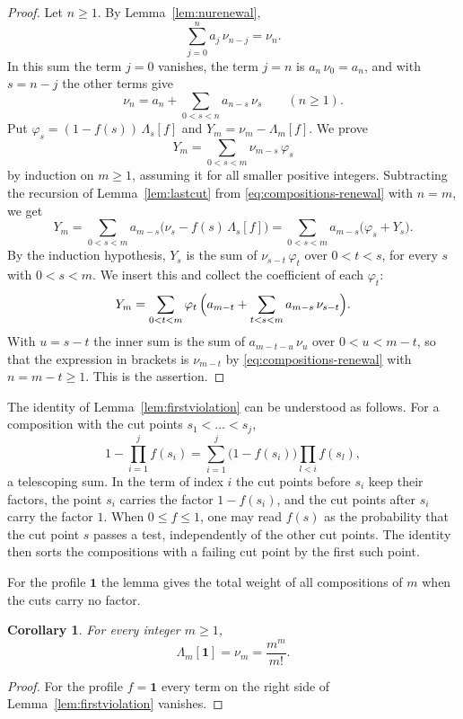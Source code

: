 \documentclass{amsart}
\newtheorem{corollary}[theorem]{Corollary}
\theoremstyle{definition}
\theoremstyle{remark}
\numberwithin{equation}{section}
\begin{document}
\begin{proof}
Let $n\ge1$. By Lemma~\ref{lem:nurenewal},
\[
\sum_{j=0}^{n}a_j\,\nu_{n-j}=\nu_n.
\]
In this sum the term $j=0$ vanishes, the term $j=n$ is $a_n\,\nu_0=a_n$, and
with $s=n-j$ the other terms give
\begin{equation}\label{eq:compositions-renewal}
\nu_n=a_n+\sum_{0<s<n}a_{n-s}\,\nu_s\qquad(n\ge1).
\end{equation}
Put $\varphi_s=(1-f(s))\,\Lambda_s[f]$ and $Y_m=\nu_m-\Lambda_m[f]$. We
prove
\[
Y_m=\sum_{0<s<m}\nu_{m-s}\,\varphi_s
\]
by induction on $m\ge1$, assuming it for all smaller positive integers.
Subtracting the recursion of
Lemma~\ref{lem:lastcut} from \eqref{eq:compositions-renewal} with $n=m$, we
get
\[
Y_m=\sum_{0<s<m}a_{m-s}\bigl(\nu_s-f(s)\,\Lambda_s[f]\bigr)
=\sum_{0<s<m}a_{m-s}\bigl(\varphi_s+Y_s\bigr).
\]
By the induction hypothesis, $Y_s$ is the sum of
$\nu_{s-t}\,\varphi_t$ over $0<t<s$, for every $s$ with $0<s<m$. We insert
this and collect the coefficient of each $\varphi_t$:
\[
Y_m=\sum_{0<t<m}\varphi_t\,\Bigl(a_{m-t}+\sum_{t<s<m}a_{m-s}\,\nu_{s-t}
\Bigr).
\]
With $u=s-t$ the inner sum is the sum of $a_{m-t-u}\,\nu_u$ over
$0<u<m-t$, so that the expression in brackets is $\nu_{m-t}$ by
\eqref{eq:compositions-renewal} with $n=m-t\ge1$. This is the assertion.
\end{proof}

The identity of Lemma~\ref{lem:firstviolation} can be understood as follows.
For a composition with the cut
points $s_1<\dots<s_j$,
\[
1-\prod_{i=1}^{j}f(s_i)=\sum_{i=1}^{j}\bigl(1-f(s_i)\bigr)\prod_{l<i}f(s_l),
\]
a telescoping sum. In the term of index $i$ the cut points before $s_i$ keep
their factors, the point $s_i$ carries the factor $1-f(s_i)$, and the cut
points after $s_i$ carry the factor $1$. When $0\le f\le1$, one
may read $f(s)$ as the probability that the cut point $s$ passes a test,
independently of the other cut points. The identity then sorts the
compositions with a failing cut point by the first such point.

For the profile $\mathbf 1$ the lemma gives the total weight of all
compositions of $m$ when the cuts carry no factor.

\begin{corollary}\label{cor:unitprofile}
For every integer $m\ge1$,
\[
\Lambda_m[\mathbf 1]=\nu_m=\frac{m^m}{m!}.
\]
\end{corollary}

\begin{proof}
For the profile $f=\mathbf 1$ every term on the right side of
Lemma~\ref{lem:firstviolation} vanishes.
\end{proof}
\end{document}
